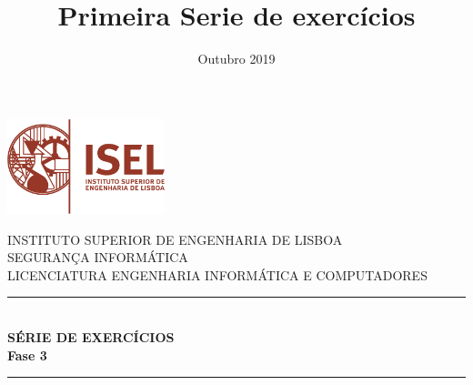 \documentclass[11pt]{report}
\title{Primeira Serie de exercícios}
\date{Outubro 2019}
\begin{document}

\begin{titlepage} 

\newcommand{\HRule}{\rule{\linewidth}{0.5mm}} %


\includegraphics[width=130pt, keepaspectratio=true]{img/logo_isel}\\[1cm] %
\center %
 

\textsc{\LARGE INSTITUTO SUPERIOR DE ENGENHARIA DE LISBOA}\\[1.5cm] %
\vskip 40pt
\textsc{\Large SEGURANÇA INFORMÁTICA}\\[0.5cm] %
\textsc{\large LICENCIATURA ENGENHARIA INFORMÁTICA E COMPUTADORES}\\[0.5cm] %
\vskip 40pt


\HRule \\[0.4cm]
{ \LARGE \bfseries SÉRIE DE EXERCÍCIOS }\\[0.4cm]
{ \huge \bfseries Fase 3}\\[0.4cm] %
\HRule \\[1.5cm]
 

\end{titlepage}
\end{document}
